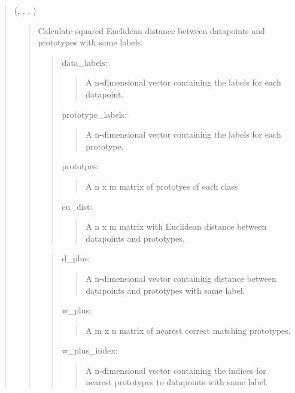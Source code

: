 \documentclass[letterpaper,10pt,english,openany,oneside]{sphinxmanual}
\begin{document}
\begin{quote}
(, , , )
\begin{quote}

Calculate squared Euclidean distance between datapoints and prototypes with same labels.

\begin{quote}

data\_labels:
\begin{quote}

A n-dimensional vector containing the labels for each datapoint.
\end{quote}

prototype\_labels:
\begin{quote}

A n-dimensional vector containing the labels for each prototype.
\end{quote}

prototpes:
\begin{quote}

A n x m matrix of prototyes of each class.
\end{quote}

eu\_dist:
\begin{quote}

A n x m matrix with Euclidean distance between datapoints and prototypes.
\end{quote}
\end{quote}

\begin{quote}

d\_plus:
\begin{quote}

A n-dimensional vector containing distance between datapoints and prototypes with same label.
\end{quote}

w\_plus:
\begin{quote}

A m x n matrix of nearest correct matching prototypes.
\end{quote}

w\_plus\_index:
\begin{quote}

A n-dimensional vector containing the indices for nearest prototypes to datapoints with same label.
\end{quote}
\end{quote}
\end{quote}


\end{quote}
\end{document}
